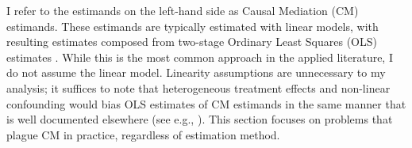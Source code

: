 I refer to the estimands on the left-hand side as Causal Mediation (CM) estimands.
These estimands are typically estimated with linear models, with resulting estimates composed from two-stage Ordinary Least Squares (OLS) estimates \citep{imai2010identification}.
While this is the most common approach in the applied literature, I do not assume the linear model.
Linearity assumptions are unnecessary to my analysis; it suffices to note that heterogeneous treatment effects and non-linear confounding would bias OLS estimates of CM estimands in the same manner that is well documented elsewhere (see e.g., \citealt{angrist1998estimating,sloczynski2022interpreting}).
This section focuses on problems that plague CM in practice, regardless of estimation method.


